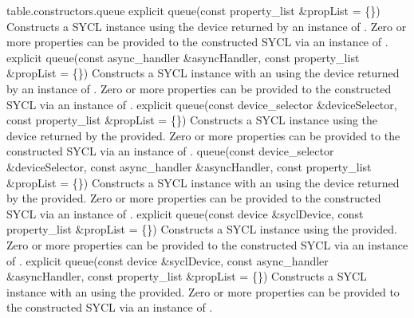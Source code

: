   {table.constructors.queue}
  \addRow
    { explicit queue(const property_list \&propList = \{\}) }
    {
      Constructs a SYCL  instance using the device returned by
      an instance of . Zero or more properties can
      be provided to the constructed SYCL  via an instance of
      .
    }
  \addRowTwoL
    { explicit queue(const async_handler \&asyncHandler, }
    { const property_list \&propList = \{\}) }
    {
      Constructs a SYCL  instance with an  using the device returned by an instance of . Zero or more properties can be provided to the
      constructed SYCL  via an instance of .
    }
  \addRowTwoL
    { explicit queue(const device_selector \&deviceSelector, }
    { const property_list \&propList = \{\}) }
    {
      Constructs a SYCL  instance using the device returned by
      the  provided. Zero or more properties can be
      provided to the constructed SYCL  via an instance of
      .
    }
  \addRowThreeL
    { queue(const device_selector \&deviceSelector, }
    { const async_handler \&asyncHandler, }
    { const property_list \&propList = \{\}) }
    {
      Constructs a SYCL  instance with an  using the device returned by the  provided. Zero or more properties can be provided to the constructed
      SYCL  via an instance of .
    }
  \addRowTwoL
    { explicit queue(const device \&syclDevice, }
    { const property_list \&propList = \{\}) }
    {
      Constructs a SYCL  instance using the  provided. Zero or more properties can be provided to the
      constructed SYCL  via an instance of .
    }
  \addRowThreeL
    { explicit queue(const device \&syclDevice, }
    { const async_handler \&asyncHandler, }
    { const property_list \&propList = \{\}) }
    {
      Constructs a SYCL  instance with an  using the  provided. Zero or more
      properties can be provided to the constructed SYCL 
      via an instance of .
    }
